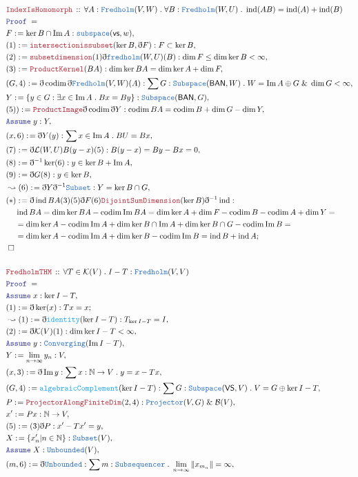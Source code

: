 \documentclass[12pt]{scrartcl}
\newcommand{\TYPE}[1]{\textcolor{NavyBlue}{\mathtt{#1}}}
\newcommand{\FUNC}[1]{\textcolor{Cerulean}{\mathtt{#1}}}
\newcommand{\LOGIC}[1]{\textcolor{Blue}{\mathtt{#1}}}
\newcommand{\THM}[1]{\textcolor{Maroon}{\mathtt{#1}}}
\renewcommand{\.}{\; . \;}
\newcommand{\de}{: \kern 0.1pc =}
\newcommand{\Theorem}[2]{& \THM{#1} \, :: \, #2 \\ & \Proof = \\ }
\newcommand{\NewLine}{\\ & \kern 1pc}
\newcommand{\Page}[1]{\begin{align*} #1 \end{align*} \newpage   }
\newcommand{ \bd }{ \ByDef }
\renewcommand{\And}{\; \& \;}
\newcommand{\Nat}{\mathbb{N} }
\DeclareMathOperator*{\im}{Im}
\newcommand{\Say}[3]{& #1 \de #2 : #3, \\}
\newcommand{\Conclude}[3]{& #1 \de #2 : #3; \\}
\newcommand{\Derive}[3]{& \leadsto #1 \de #2 : #3, \\}
\newcommand{\A}{\LOGIC{Assume} \;}
\newcommand{\Assume}[2]{& \A #1 : #2, \\}
\newcommand{\QED}{\; \square}
\newcommand{\EndProof}{& \QED \\}
\newcommand{\ByDef}{\eth}
\newcommand{\Proof}{\LOGIC{Proof} \; }
\DeclareMathOperator{\codim}{codim}
\DeclareMathOperator{\ind}{ind}
\newcommand{\BAN}{\mathsf{BAN}} %
\newcommand{\K}{\mathcal{K}} %
\newcommand{\B}{\mathcal{B}}
\begin{document}
      \Page{
      \Theorem{IndexIsHomomorph}{\forall A : \TYPE{Fredholm}(V,W) \. \forall B : \TYPE{Fredholm}(W,U) \. \ind(AB) = \ind(A) + \ind(B) }
      \Say{F}{\ker B \cap \im A   }{\TYPE{subspace}(\mathsf{vs},w)}
      \Say{(1)}{\THM{intersectionissubset}( \ker B,\bd F)}{ F \subset \ker B}
      \Say{(2)}{ \THM{subsetdimension}(1) \bd \TYPE{fredholm}(W,U)(B)}{ \dim F \le \dim \ker B < \infty  }
      \Say{(3)}{\THM{ProductKernel}(BA) }{ \dim \ker BA = \dim \ker A  + \dim F}
      \Say{ (G,4) }{ \bd \codim \bd \TYPE{Fredholm}(V,W)(A) }{ \sum G : \TYPE{Subspace}(\BAN,W) \. W =  \im A \oplus G \And \dim G < \infty  }
      \Say{Y}{\{ y \in G : \exists x \in \im A \. Bx = By \} }{\TYPE{Subspace}(\BAN,G)}
      \Say{(5))}{\THM{ProductImage}\bd \codim \bd Y}{ \codim BA =  \codim B + \dim  G - \dim Y  }
      \Assume{y}{Y}
      \Say{(x,6)}{\bd Y(y)}{\sum x \in \im A  \. BU = Bx}
      \Say{(7)}{\bd \mathcal{L}(W,U) B(y - x)(5) }{B(y -x) = By - Bx =  0} 
      \Say{(8)}{\bd^{-1} \ker (6)}{y \in \ker B + \im A}
      \Say{(9)}{\bd G (8)}{y \in \ker B}
      \Derive{(6)}{\bd Y \bd^{-1} \TYPE{Subset}}{ Y = \ker B \cap G }
      \Conclude{(*)}{ \bd \ind BA (3)(5) \bd F (6) \THM{DijointSumDimension}(\ker B)\bd^{-1} \ind }{
	      \NewLine
      	\ind BA = \dim \ker BA - \codim \im BA = 
      	\dim \ker A + \dim  F  - \codim B - \codim A + \dim Y = \NewLine =
      	\dim \ker A - \codim \im A   + \dim \ker B \cap \im A + \dim \ker B \cap G  - \codim \im B = \NewLine =
        \dim \ker A - \codim \im A  + \dim \ker B  -  \codim \im B =
        \ind B + \ind A
      }
      \EndProof
      \\
      	\Theorem{FredholmTHM}{\forall T \in \K(V) \. I - T : \TYPE{Fredholm}(V,V)}
      	\Assume{x}{\ker I - T}
      	\Conclude{(1)}{\bd \ker (x)}{Tx = x}
      	\Derive{(1)}{ \bd \FUNC{identity}(\ker I - T) }{ T_{\ker I - T} = I}
      	\Say{(2)}{\bd \K(V) (1)}{ \dim \ker I - T < \infty  }
      	\Assume{y}{\TYPE{Converging}(\im I - T)}
      	\Say{Y}{\lim_{n \to \infty} y_n}{V}
      	\Say{(x,3)}{\bd \im y}{ \sum x : \Nat \to V \. y = x - Tx}
      	\Say{(G,4)}{\FUNC{algebraicComplement}(\ker I - T)}{ \sum G : \TYPE{Subspace}(\mathsf{VS},V) \. V = G \oplus \ker I - T }
      	\Say{P}{\THM{ProjectorAlongFiniteDim}(2,4)}{ \TYPE{Projector}(V,G) \And \B(V)   }
      	\Say{x'}{Px}{ \Nat \to V}
      	\Say{(5)}{(3)\bd P}{  x' - Tx' = y}
      	\Say{X}{\{ x'_n | n \in \Nat  \}}{ \TYPE{Subset}(V) }
      	\Assume{ X  }{\TYPE{Unbounded}(V)}
      	\Say{(m,6)}{\bd \TYPE{Unbounded}}{\sum m : \TYPE{Subsequencer} \. \lim_{n \to \infty} \|x_{m_n}\| = \infty  }
}
\end{document}
